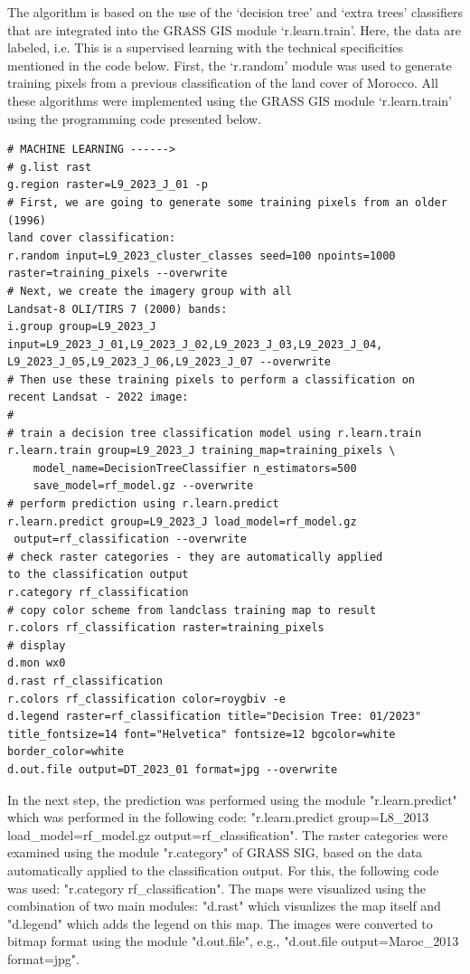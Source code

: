 \documentclass[geomatics,article,submit,pdftex,moreauthors]{Definitions/mdpi}
\begin{document}
The algorithm is based on the use of the ‘decision tree’ and ‘extra trees’ classifiers that are integrated into the GRASS GIS module ‘r.learn.train’. Here, the data are labeled, i.e. This is a supervised learning with the technical specificities mentioned in the code below. First, the ‘r.random’ module was used to generate training pixels from a previous classification of the land cover of Morocco. All these algorithms were implemented using the GRASS GIS module ‘r.learn.train’ using the programming code presented below.

\begin{footnotesize}
\begin{verbatim}
# MACHINE LEARNING ------>
# g.list rast
g.region raster=L9_2023_J_01 -p
# First, we are going to generate some training pixels from an older (1996) 
land cover classification:
r.random input=L9_2023_cluster_classes seed=100 npoints=1000 
raster=training_pixels --overwrite
# Next, we create the imagery group with all 
Landsat-8 OLI/TIRS 7 (2000) bands:
i.group group=L9_2023_J 
input=L9_2023_J_01,L9_2023_J_02,L9_2023_J_03,L9_2023_J_04,
L9_2023_J_05,L9_2023_J_06,L9_2023_J_07 --overwrite
# Then use these training pixels to perform a classification on 
recent Landsat - 2022 image:
#
# train a decision tree classification model using r.learn.train
r.learn.train group=L9_2023_J training_map=training_pixels \
    model_name=DecisionTreeClassifier n_estimators=500 
    save_model=rf_model.gz --overwrite
# perform prediction using r.learn.predict
r.learn.predict group=L9_2023_J load_model=rf_model.gz
 output=rf_classification --overwrite
# check raster categories - they are automatically applied 
to the classification output
r.category rf_classification
# copy color scheme from landclass training map to result
r.colors rf_classification raster=training_pixels
# display
d.mon wx0
d.rast rf_classification
r.colors rf_classification color=roygbiv -e
d.legend raster=rf_classification title="Decision Tree: 01/2023" 
title_fontsize=14 font="Helvetica" fontsize=12 bgcolor=white 
border_color=white
d.out.file output=DT_2023_01 format=jpg --overwrite
\end{verbatim}
\end{footnotesize}

In the next step, the prediction was performed using the module "r.learn.predict" which was performed in the following code: "r.learn.predict group=L8\_2013 load\_model=rf\_model.gz output=rf\_classification". The raster categories were examined using the module "r.category" of GRASS SIG, based on the data automatically applied to the classification output. For this, the following code was used: "r.category rf\_classification". The maps were visualized using the combination of two main modules: "d.rast" which visualizes the map itself and "d.legend" which adds the legend on this map. The images were converted to bitmap format using the module "d.out.file", e.g., "d.out.file output=Maroc\_2013 format=jpg".
\end{document}
